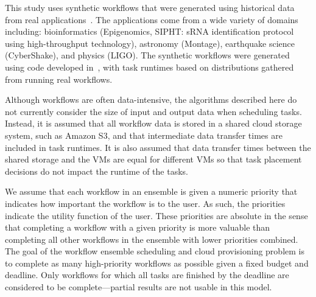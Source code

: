 \documentclass[preprint,5p]{elsarticle}
\begin{document}
This study uses synthetic workflows that were generated using historical data
from real applications~\cite{Bharathi2008}. The applications come from a wide
variety of domains including: bioinformatics (Epigenomics, SIPHT: sRNA
identification protocol using high-throughput technology), astronomy
(Montage), earthquake science (CyberShake), and physics (LIGO). The synthetic
workflows were generated using code developed in~\cite{WorkflowGenerator},
with task runtimes based on distributions gathered from running real
workflows.

Although workflows are often data-intensive, the algorithms described
here do not currently consider the size of input and output data
when scheduling tasks. Instead, it is assumed that all workflow data is stored in
a shared cloud storage system, such as Amazon S3, and that intermediate data
transfer times are included in task runtimes. It is also assumed that
data transfer times between the shared storage and the VMs are equal for
different VMs so that task placement decisions do not impact the
runtime of the tasks.

We assume that each workflow in an ensemble is given a numeric priority that
indicates how important the workflow is to the user. As such, the priorities
indicate the utility function of the user. These priorities are absolute in
the sense that completing a workflow with a given priority is more valuable
than completing all other workflows in the ensemble with lower priorities
combined. The goal of the workflow ensemble scheduling and cloud provisioning
problem is to complete as many high-priority workflows as possible given a
fixed budget and deadline. Only workflows for which all tasks are finished by
the deadline are considered to be complete---partial results are not usable in
this model.
\end{document}
